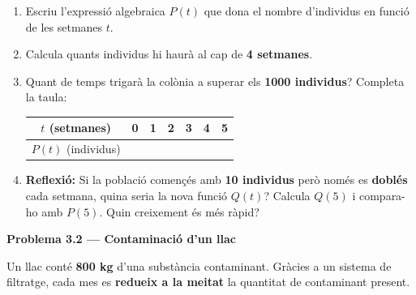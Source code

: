 \documentclass[12pt,a4paper]{article}
\begin{document}
\begin{enumerate}[label=\alph*), leftmargin=1.5cm, itemsep=0.3cm]
    \item Escriu l'expressi\'o algebraica $P(t)$ que dona el nombre d'individus en funci\'o de les setmanes $t$.

    \item Calcula quants individus hi haur\`a al cap de \textbf{4 setmanes}.

    \item Quant de temps trigar\`a la col\`onia a superar els \textbf{1000 individus}? Completa la taula:

    \vspace{0.3cm}
    \begin{center}
    \renewcommand{\arraystretch}{2}
    \begin{tabular}{|c|c|c|c|c|c|c|}
    \hline
    $t$ (setmanes) & 0 & 1 & 2 & 3 & 4 & 5 \\
    \hline
    $P(t)$ (individus) & & & & & & \\
    \hline
    \end{tabular}
    \end{center}

    \item \textbf{Reflexi\'o:} Si la poblaci\'o comen\c{c}\'es amb \textbf{10 individus} per\`o nom\'es es \textbf{dobl\'es} cada setmana, quina seria la nova funci\'o $Q(t)$? Calcula $Q(5)$ i compara-ho amb $P(5)$. Quin creixement \'es m\'es r\`apid?
\end{enumerate}

\vspace{0.6cm}

\noindent\textbf{Problema 3.2 --- Contaminaci\'o d'un llac}

\vspace{0.2cm}
\noindent Un llac cont\'e \textbf{800 kg} d'una subst\`ancia contaminant. Gr\`acies a un sistema de filtratge, cada mes es \textbf{redueix a la meitat} la quantitat de contaminant present.
\end{document}
